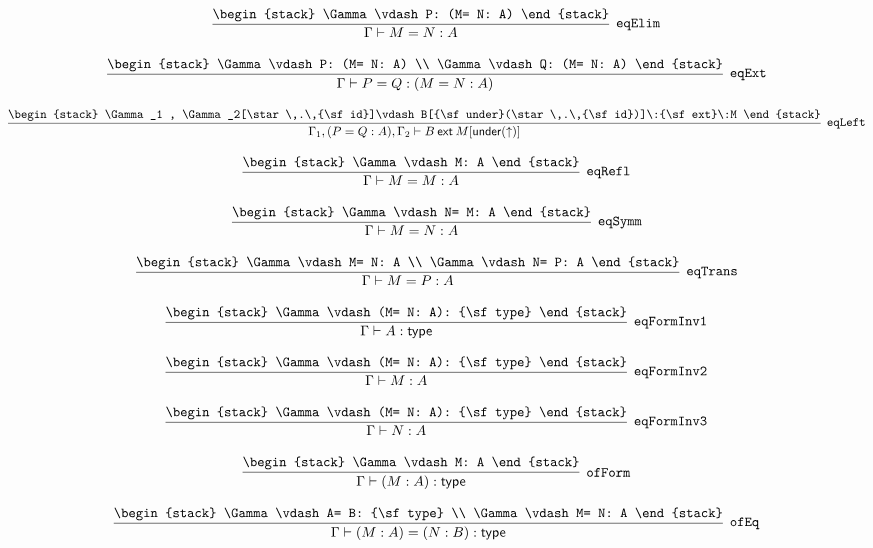 \[
\infer[{\tt eqElim}]{\Gamma \vdash M= N: A}{
\begin{stack}
\Gamma \vdash P: (M= N: A)
\end{stack}}
\]

\[
\infer[{\tt eqExt}]{\Gamma \vdash P= Q: (M= N: A)}{
\begin{stack}
\Gamma \vdash P: (M= N: A)
\\
\Gamma \vdash Q: (M= N: A)
\end{stack}}
\]

\[
\infer[{\tt eqLeft}]{\Gamma_1 ,(P= Q: A), \Gamma_2 \vdash B\:{\sf ext}\:M[{\sf under}(\uparrow )]}{
\begin{stack}
\Gamma_1 , \Gamma_2[\star \,.\,{\sf id}]\vdash B[{\sf under}(\star \,.\,{\sf id})]\:{\sf ext}\:M
\end{stack}}
\]

\[
\infer[{\tt eqRefl}]{\Gamma \vdash M= M: A}{
\begin{stack}
\Gamma \vdash M: A
\end{stack}}
\]

\[
\infer[{\tt eqSymm}]{\Gamma \vdash M= N: A}{
\begin{stack}
\Gamma \vdash N= M: A
\end{stack}}
\]

\[
\infer[{\tt eqTrans}]{\Gamma \vdash M= P: A}{
\begin{stack}
\Gamma \vdash M= N: A
\\
\Gamma \vdash N= P: A
\end{stack}}
\]

\[
\infer[{\tt eqFormInv1}]{\Gamma \vdash A: {\sf type}}{
\begin{stack}
\Gamma \vdash (M= N: A): {\sf type}
\end{stack}}
\]

\[
\infer[{\tt eqFormInv2}]{\Gamma \vdash M: A}{
\begin{stack}
\Gamma \vdash (M= N: A): {\sf type}
\end{stack}}
\]

\[
\infer[{\tt eqFormInv3}]{\Gamma \vdash N: A}{
\begin{stack}
\Gamma \vdash (M= N: A): {\sf type}
\end{stack}}
\]

\[
\infer[{\tt ofForm}]{\Gamma \vdash (M: A): {\sf type}}{
\begin{stack}
\Gamma \vdash M: A
\end{stack}}
\]

\[
\infer[{\tt ofEq}]{\Gamma \vdash (M: A)= (N: B): {\sf type}}{
\begin{stack}
\Gamma \vdash A= B: {\sf type}
\\
\Gamma \vdash M= N: A
\end{stack}}
\]

